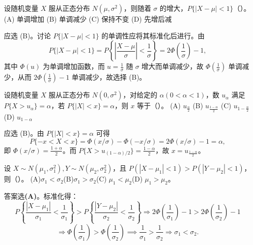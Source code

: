 \documentclass[lang=cn,11pt]{elegantbook}
\begin{document}
\begin{exercise}\label{exer:2-17}
设随机变量 $X$ 服从正态分布 $N(\mu,\sigma^2)$，则随着 $\sigma$ 的增大，$P\{|X-\mu|<1\}$（\quad）。\\
(A) 单调增加 \quad (B) 单调减少 \quad (C) 保持不变 \quad (D) 先增后减
\end{exercise}
\begin{solution}
应选 (B)。讨论 $P\{|X-\mu|<1\}$ 的单调性应将其标准化后进行。由
\[
P\{|X-\mu|<1\} = P\left\{\left|\frac{X-\mu}{\sigma}\right|<\frac{1}{\sigma}\right\} = 2\Phi\left(\frac{1}{\sigma}\right) - 1,
\]
其中 $\Phi(u)$ 为单调增加函数，而 $u = \frac{1}{\sigma}$ 随 $\sigma$ 增大而单调减少，故 $\Phi\left(\frac{1}{\sigma}\right)$ 单调减少，从而 $2\Phi\left(\frac{1}{\sigma}\right)-1$ 单调减少，故选择 (B)。
\end{solution}

\begin{exercise}\label{exer:2-12}
设随机变量 $X$ 服从正态分布 $N(0,\sigma^2)$，对给定的 $\alpha(0<\alpha<1)$，数 $u_\alpha$ 满足 $P\{X>u_\alpha\} = \alpha$，若 $P\{|X|<x\} = \alpha$，则 $x$ 等于（\quad）。
(A) $u_{\frac{\alpha}{2}}$ \quad (B) $u_{\frac{1-\alpha}{2}}$ \quad (C) $u_{1-\frac{\alpha}{2}}$ \quad (D) $u_{1-\alpha}$
\end{exercise}

\begin{solution}
应选 (B)。由 $P\{|X|<x\} = \alpha$ 可得
\[
P\{-x < X < x\} = \Phi(x/\sigma) - \Phi(-x/\sigma) = 2\Phi(x/\sigma) - 1 = \alpha,
\]
即 $\Phi(x/\sigma) = \frac{1+\alpha}{2}$。而 $P\{X>u_{(1-\alpha)/2}\} = \frac{1-\alpha}{2}$，故 $x = u_{\frac{1-\alpha}{2}}$。
\end{solution}


\begin{exercise}[正态分布标准差比较]
设 $X\sim N(\mu_1,\sigma_1^2), Y\sim N(\mu_2,\sigma_2^2)$，且 $P(|X-\mu_1|<1)>P(|Y-\mu_2|<1)$，则（\quad）。
(A)$\sigma_1<\sigma_2$\quad (B)$\sigma_1>\sigma_2$\quad (C) $\mu_1<\mu_2$\quad (D) $\mu_1>\mu_2$。
\end{exercise}
\begin{solution}
答案选\textbf{(A)}。标准化得：
\[
P\left\{\frac{|X-\mu_1|}{\sigma_1}<\frac{1}{\sigma_1}\right\}>P\left\{\frac{|Y-\mu_2|}{\sigma_2}<\frac{1}{\sigma_2}\right\}
\Rightarrow 2\Phi\left(\frac{1}{\sigma_1}\right)-1 > 2\Phi\left(\frac{1}{\sigma_2}\right)-1
\]
\[
\Rightarrow \Phi\left(\frac{1}{\sigma_1}\right)>\Phi\left(\frac{1}{\sigma_2}\right)\implies
\frac{1}{\sigma_1}>\frac{1}{\sigma_2} \Rightarrow \sigma_1<\sigma_2.
\]
\end{solution}
\end{document}
